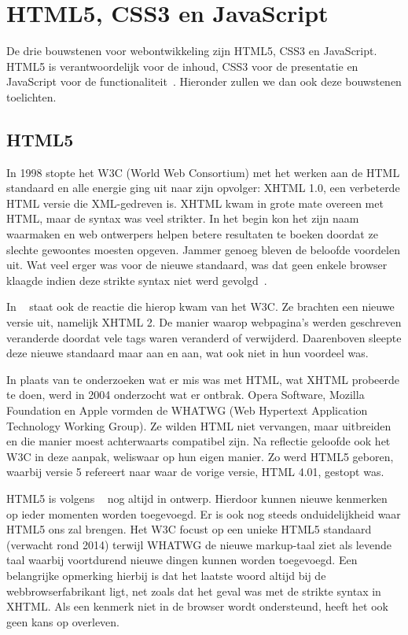 
\section{HTML5, CSS3 en JavaScript}
\label{sec:html5-css3-js}
De drie bouwstenen voor webontwikkeling zijn HTML5, CSS3 en JavaScript. HTML5 is verantwoordelijk voor de inhoud, CSS3 voor de presentatie en JavaScript voor de functionaliteit~\cite{PhilDutson2012}. Hieronder zullen we dan ook deze bouwstenen toelichten.

\subsection{HTML5}
In 1998 stopte het W3C (World Web Consortium) met het werken aan de HTML standaard en alle energie ging uit naar zijn opvolger: XHTML 1.0, een verbeterde HTML versie die XML-gedreven is. XHTML kwam in grote mate overeen met HTML, maar de syntax was veel strikter. In het begin kon het zijn naam waarmaken en web ontwerpers helpen betere resultaten te boeken doordat ze slechte gewoontes moesten opgeven. Jammer genoeg bleven de beloofde voordelen uit. Wat veel erger was voor de nieuwe standaard, was dat geen enkele browser klaagde indien deze strikte syntax niet werd gevolgd~\cite{MacDonald2011}.

In ~\cite{MacDonald2011} staat ook de reactie die hierop kwam van het W3C.  Ze brachten een nieuwe versie uit, namelijk XHTML 2. De manier waarop webpagina's werden geschreven veranderde doordat vele tags waren veranderd of verwijderd. Daarenboven sleepte deze nieuwe standaard maar aan en aan, wat ook niet in hun voordeel was. 

In plaats van te onderzoeken wat er mis was met HTML, wat XHTML probeerde te doen, werd in 2004 onderzocht wat er ontbrak. Opera Software, Mozilla Foundation en Apple vormden de WHATWG (Web Hypertext Application Technology Working Group). Ze wilden HTML niet vervangen, maar uitbreiden en die manier moest achterwaarts compatibel zijn. Na reflectie geloofde ook het W3C in deze aanpak, weliswaar op hun eigen manier.  Zo werd HTML5 geboren, waarbij versie 5 refereert naar waar de vorige versie, HTML 4.01, gestopt was.

HTML5 is volgens ~\cite{MacDonald2011} nog altijd in ontwerp. Hierdoor kunnen nieuwe kenmerken op ieder momenten worden toegevoegd.  Er is ook nog steeds onduidelijkheid waar HTML5 ons zal brengen.  Het W3C focust op een unieke HTML5 standaard (verwacht rond 2014) terwijl WHATWG de nieuwe markup-taal ziet als levende taal waarbij voortdurend  nieuwe dingen kunnen worden toegevoegd. Een belangrijke opmerking hierbij is dat het laatste woord altijd bij de webbrowserfabrikant ligt, net zoals dat het geval was met de strikte syntax in XHTML. Als een kenmerk niet in de browser wordt ondersteund, heeft het ook geen kans op overleven.

